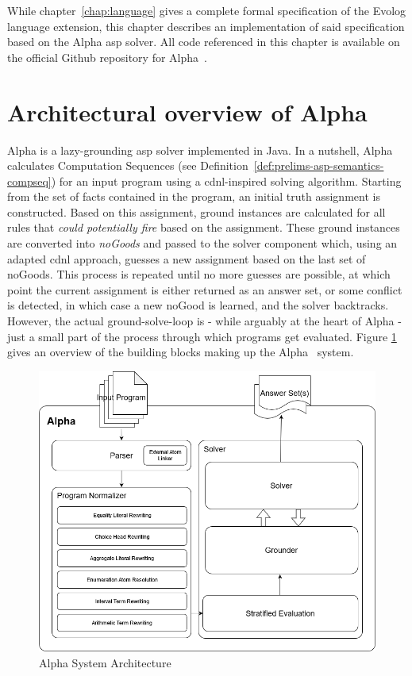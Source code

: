 While chapter~\ref{chap:language} gives a complete formal specification of the Evolog language extension, this chapter describes an implementation of said specification based on the Alpha \gls{asp} solver. All code referenced in this chapter is available on the official Github repository for Alpha~\cite{evolog-pr}.

\section{Architectural overview of Alpha}
\label{sec:alpha-arch-overview}

Alpha is a lazy-grounding \gls{asp} solver implemented in Java. In a nutshell, Alpha calculates Computation Sequences (see Definition~\ref{def:prelims-asp-semantics-compseq}) for an input program using a \gls{cdnl}-inspired solving algorithm. Starting from the set of facts contained in the program, an initial truth assignment is constructed. Based on this assignment, ground instances are calculated for all rules that \emph{could potentially fire} based on the assignment. These ground instances are converted into \emph{noGoods} and passed to the solver component which, using an adapted \gls{cdnl} approach, guesses a new assignment based on the last set of noGoods. This process is repeated until no more guesses are possible, at which point the current assignment is either returned as an answer set, or some conflict is detected, in which case a new noGood is learned, and the solver backtracks. However, the actual ground-solve-loop is - while arguably at the heart of Alpha - just a small part of the process through which programs get evaluated. Figure \ref{fig:alpha-arch} gives an overview of the building blocks making up the Alpha~\cite{alpha} system.

\begin{figure}[t]
    \includegraphics[width=\linewidth]{graphics/alpha-architecture.drawio.png}
    \caption{Alpha System Architecture}
    \label{fig:alpha-arch}
\end{figure}

